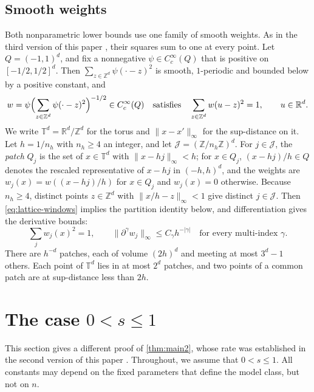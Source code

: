 \section{Smooth weights}\label{sec:prelim-windows}

Both nonparametric lower bounds use one family of smooth weights. As
in the third version of this paper
\cite[Section~1.2, Step~3]{AronowLopatto2026v3}, their squares sum to
one at every point.
Let $Q=(-1,1)^d$, and fix a nonnegative
$\psi\in C_c^\infty(Q)$ that is positive on $[-1/2,1/2]^d$. Then
$\sum_{z\in\mathbb Z^d}\psi(\cdot-z)^2$ is smooth, $1$-periodic and
bounded below by a positive constant, and
\begin{equation}\label{eq:lattice-windows}
 w=\psi\Bigl(\sum_{z\in\mathbb Z^d}\psi(\cdot-z)^2\Bigr)^{-1/2}
 \in C_c^\infty(Q)
 \quad\text{satisfies}\quad
 \sum_{z\in\mathbb Z^d}w(u-z)^2=1,\qquad u\in\mathbb R^d.
\end{equation}
We write $\mathbb T^d=\mathbb R^d/\mathbb Z^d$ for the torus and
$\|x-x'\|_\infty$ for the sup-distance on it. Let $h=1/n_h$ with $n_h\ge4$
an integer, and let $\mathcal J=(\mathbb Z/n_h\mathbb Z)^d$. For
$j\in\mathcal J$, the \emph{patch} $Q_j$ is the set of $x\in\mathbb T^d$ with
$\|x-hj\|_\infty<h$; for $x\in Q_j$, $(x-hj)/h\in Q$ denotes the
rescaled representative of $x-hj$ in $(-h,h)^d$, and the weights are
$w_j(x)=w((x-hj)/h)$ for $x\in Q_j$ and $w_j(x)=0$ otherwise. Because
$n_h\ge4$, distinct points $z\in\mathbb Z^d$ with $\|x/h-z\|_\infty<1$
give distinct $j\in\mathcal J$. Then \eqref{eq:lattice-windows}
implies the partition identity below, and differentiation gives the
derivative bounds:
\begin{equation}\label{eq:smooth-windows}
 \sum_jw_j(x)^2=1,\qquad
 \|\partial^\gamma w_j\|_\infty\le C_\gamma h^{-|\gamma|}
 \quad\text{for every multi-index }\gamma.
\end{equation}
There are $h^{-d}$ patches, each of volume $(2h)^d$ and meeting at most
$3^d-1$ others. Each point of $\mathbb T^d$ lies in at most $2^d$ patches,
and two points of a common patch are at sup-distance less than $2h$.
\chapter{The case \texorpdfstring{$0<s\le1$}{0 < s <= 1}}
\label{sec:small-s}

This section gives a different proof of \cref{thm:main2}, whose rate
was established in the second version of this paper
\cite[Theorem~1.2 and Appendix~A]{AronowLopatto2026v2}.
Throughout, we
assume that $0<s\le1$. All constants may depend on the fixed parameters
that define the model class, but not on $n$.

